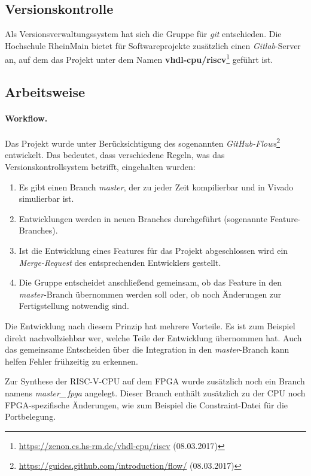 \subsection{Versionskontrolle}
Als Versionsverwaltungssystem hat sich die Gruppe für \emph{git}
entschieden. Die Hochschule RheinMain bietet für Softwareprojekte
zusätzlich einen \emph{Gitlab}-Server an, auf dem das Projekt unter
dem Namen
\textbf{vhdl-cpu/riscv}\footnote{\url{https://zenon.cs.hs-rm.de/vhdl-cpu/riscv}
(08.03.2017)} geführt ist.

\subsection{Arbeitsweise}

\paragraph{Workflow.} Das Projekt wurde unter Berücksichtigung des sogenannten
\emph{GitHub-Flows}\footnote{\url{https://guides.github.com/introduction/flow/}
(08.03.2017)}
entwickelt. Das bedeutet, dass verschiedene Regeln, was das 
Versionskontrollsystem betrifft, eingehalten wurden:

\begin{enumerate}
\item Es gibt einen Branch \emph{master}, der zu jeder Zeit kompilierbar
und in Vivado simulierbar ist.
\item Entwicklungen werden in neuen Branches durchgeführt (sogenannte
Feature-Branches).
\item Ist die Entwicklung eines Features für das Projekt abgeschlossen
wird ein \emph{Merge-Request} des entsprechenden Entwicklers gestellt.
\item Die Gruppe entscheidet anschließend gemeinsam, ob das Feature in
den \emph{master}-Branch übernommen werden soll oder, ob noch Änderungen
zur Fertigstellung notwendig sind.
\end{enumerate}

Die Entwicklung nach diesem Prinzip hat mehrere Vorteile. Es ist zum
Beispiel direkt nachvollziehbar wer, welche Teile der Entwicklung
übernommen hat. Auch das gemeinsame Entscheiden über die Integration in
den \emph{master}-Branch kann helfen Fehler frühzeitig zu erkennen.

Zur Synthese der RISC-V-CPU auf dem FPGA wurde zusätzlich noch ein Branch
namens \emph{master\_\,fpga} angelegt. Dieser Branch enthält zusätzlich zu
der CPU noch FPGA-spezifische Änderungen, wie zum Beispiel die
Constraint-Datei für die Portbelegung.

